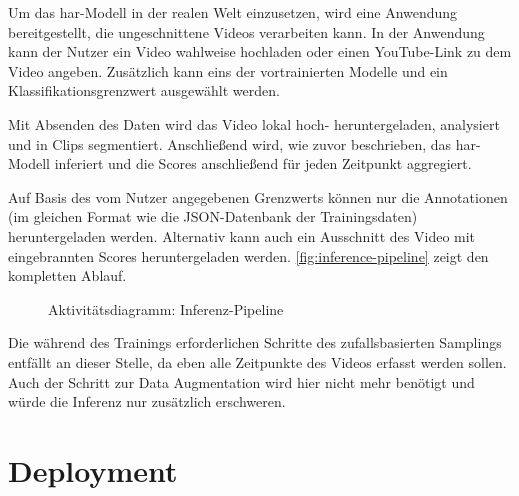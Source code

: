 Um das \gls{har}-Modell in der realen Welt einzusetzen, wird eine Anwendung bereitgestellt, die ungeschnittene Videos verarbeiten kann.
In der Anwendung kann der Nutzer ein Video wahlweise hochladen oder einen YouTube-Link zu dem Video angeben.
Zusätzlich kann eins der vortrainierten Modelle und ein Klassifikationsgrenzwert ausgewählt werden.

Mit Absenden des Daten wird das Video lokal hoch- \bzw heruntergeladen, analysiert und in Clips segmentiert.
Anschließend wird, wie zuvor beschrieben, das \gls{har}-Modell inferiert und die Scores anschließend für jeden Zeitpunkt aggregiert.

Auf Basis des vom Nutzer angegebenen Grenzwerts können nur die Annotationen (im gleichen Format wie die JSON-Datenbank der Trainingsdaten) heruntergeladen werden.
Alternativ kann auch ein Ausschnitt des Video mit eingebrannten Scores heruntergeladen werden.
\autoref{fig:inference-pipeline} zeigt den kompletten Ablauf.

\begin{figure}
    \centering
    \caption{Aktivitätsdiagramm: Inferenz-Pipeline}
    \label{fig:inference-pipeline}
\end{figure}

Die während des Trainings erforderlichen Schritte des zufallsbasierten Samplings entfällt an dieser Stelle, da eben alle Zeitpunkte des Videos erfasst werden sollen.
Auch der Schritt zur Data Augmentation wird hier nicht mehr benötigt und würde die Inferenz nur zusätzlich erschweren.

\section{Deployment}


